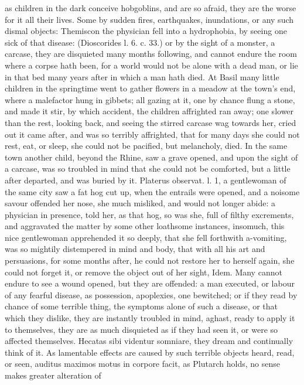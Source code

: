 {as children in the dark conceive hobgoblins, and are so afraid, they
are the worse for it all their lives. Some by sudden fires,
earthquakes, inundations, or any such dismal objects: Themiscon the
physician fell into a hydrophobia, by seeing one sick of that disease:
(Dioscorides l. 6. c. 33.) or by the sight of a monster, a carcase,
they are disquieted many months following, and cannot endure the room
where a corpse hath been, for a world would not be alone with a dead
man, or lie in that bed many years after in which a man hath died. At
Basil many little children in the springtime went to gather
flowers in a meadow at the town's end, where a malefactor hung in
gibbets; all gazing at it, one by chance flung a stone, and made it
stir, by which accident, the children affrighted ran away; one slower
than the rest, looking back, and seeing the stirred carcase wag towards
her, cried out it came after, and was so terribly affrighted, that for
many days she could not rest, eat, or sleep, she could not be pacified,
but melancholy, died. In the same town another child, beyond the
Rhine, saw a grave opened, and upon the sight of a carcase, was so
troubled in mind that she could not be comforted, but a little after
departed, and was buried by it. Platerus observat. l. 1, a gentlewoman
of the same city saw a fat hog cut up, when the entrails were opened,
and a noisome savour offended her nose, she much misliked, and would
not longer abide: a physician in presence, told her, as that hog, so
was she, full of filthy excrements, and aggravated the matter by some
other loathsome instances, insomuch, this nice gentlewoman apprehended
it so deeply, that she fell forthwith a-vomiting, was so mightily
distempered in mind and body, that with all his art and persuasions,
for some months after, he could not restore her to herself again, she
could not forget it, or remove the object out of her sight, Idem. Many
cannot endure to see a wound opened, but they are offended: a man
executed, or labour of any fearful disease, as possession, apoplexies,
one bewitched; or if they read by chance of some terrible thing,
the symptoms alone of such a disease, or that which they dislike, they
are instantly troubled in mind, aghast, ready to apply it to
themselves, they are as much disquieted as if they had seen it, or were
so affected themselves. Hecatas sibi videntur somniare, they dream and
continually think of it. As lamentable effects are caused by such
terrible objects heard, read, or seen, auditus maximos motus in corpore
facit, as Plutarch holds, no sense makes greater alteration of
}
